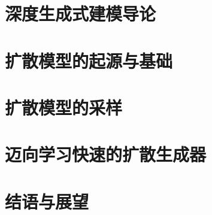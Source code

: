 \documentclass[examplefnt,biber]{nowfnt-arxiv} %
\newtheorem[M]{question}{\sffamily\bfseries 问题}[section]
\begin{document}


\part{深度生成式建模导论}

\part{扩散模型的起源与基础}







\part{扩散模型的采样}




\part{迈向学习快速的扩散生成器}



\part*{结语与展望}

% 




\appendix









\backmatter  %




\printbibliography[title={参考文献}]
\end{document}
